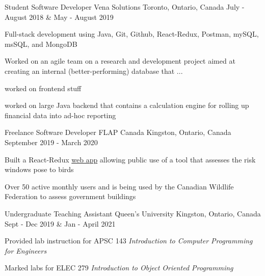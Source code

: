 \begin{cventries}
  \cventry
    {Student Software Developer} %
    {Vena Solutions} %
    {Toronto, Ontario, Canada} %
    {July - August 2018 \& May - August 2019} %
    {
      \begin{cvitems} %
        \item {Full-stack development using Java, Git, Github, React-Redux, Postman, mySQL, msSQL, and MongoDB}
        \item{Worked on an agile team on a research and development project aimed at creating an internal (better-performing) database that ...}
        \item{worked on frontend stuff}
        \item{worked on large Java backend that contains a calculation engine for rolling up financial data into ad-hoc reporting}
      \end{cvitems}
    }

  \cventry
    {Freelance Software Developer} %
    {FLAP Canada} %
    {Kingston, Ontario, Canada} %
    {September 2019 - March 2020} %
    {
      \begin{cvitems} %
        \item {Built a React-Redux \href{https://www.flapapp.ca/}{web app} allowing public use of a tool that assesses the risk windows pose to birds}
        \item{Over 50 active monthly users and is being used by the Canadian Wildlife Federation to assess government buildings}
      \end{cvitems}
    }

  \cventry
    {Undergraduate Teaching Assistant} %
    {Queen's University} %
    {Kingston, Ontario, Canada} %
    {Sept - Dec 2019 \& Jan - April 2021} %
    {
      \begin{cvitems} %
        \item{Provided lab instruction for APSC 143 \textit{Introduction to Computer Programming for Engineers}}
        \item{Marked labs for ELEC 279 \textit{Introduction to Object Oriented Programming}}
      \end{cvitems}
    }


\end{cventries}
